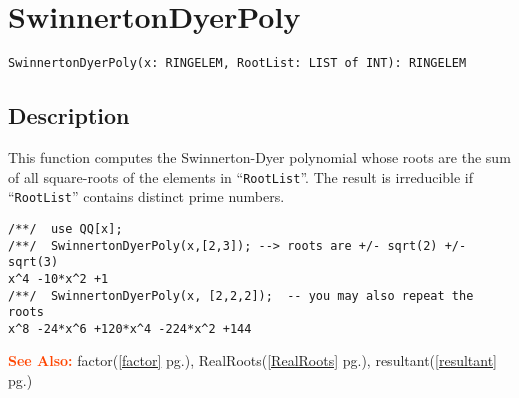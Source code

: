 \documentclass[a4paper]{mybook}
\newenvironment{command}{}{} %
\newcommand\SeeAlso{\par\textcolor{OrangeRed}{\textbf{\large See Also: }}}
\begin{document}
\section{SwinnertonDyerPoly}
\label{SwinnertonDyerPoly}
\begin{command} %


\begin{Verbatim}[label=syntax, rulecolor=\color{MidnightBlue},
frame=single]
SwinnertonDyerPoly(x: RINGELEM, RootList: LIST of INT): RINGELEM
\end{Verbatim}


\subsection*{Description}

This function computes the Swinnerton-Dyer polynomial whose roots are
the sum of all square-roots of the elements in ``\verb&RootList&''.  The result
is irreducible if ``\verb&RootList&'' contains distinct prime numbers.
\begin{Verbatim}[label=example, rulecolor=\color{PineGreen}, frame=single]
/**/  use QQ[x];
/**/  SwinnertonDyerPoly(x,[2,3]); --> roots are +/- sqrt(2) +/- sqrt(3)
x^4 -10*x^2 +1
/**/  SwinnertonDyerPoly(x, [2,2,2]);  -- you may also repeat the roots
x^8 -24*x^6 +120*x^4 -224*x^2 +144
\end{Verbatim}


\SeeAlso %
  factor(\ref{factor} pg.\pageref{factor}), 
    RealRoots(\ref{RealRoots} pg.\pageref{RealRoots}), 
    resultant(\ref{resultant} pg.\pageref{resultant})
\end{command} %
\end{document}

